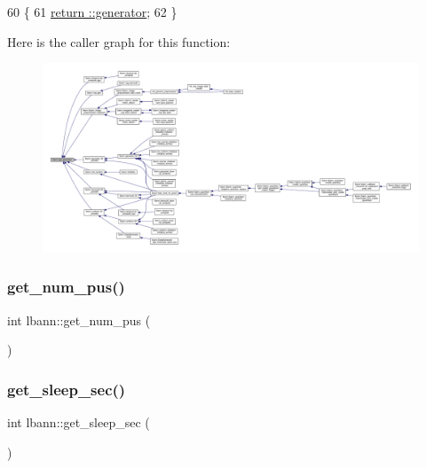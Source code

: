 \begin{DoxyCode}
60                          \{
61   \hyperlink{namespaceanonymous__namespace_02random_8cpp_03_a83826c4b587d1825f13b833be6fe047f}{return ::generator};
62 \}
\end{DoxyCode}
Here is the caller graph for this function\+:\nopagebreak
\begin{figure}[H]
\begin{center}
\leavevmode
\includegraphics[width=350pt]{namespacelbann_a4fea7ba21017b49d1e34394b4c20c764_icgraph}
\end{center}
\end{figure}
\mbox{\label{namespacelbann_abee17f56525b3894b0d3621a307faebd}} 
\subsubsection{\texorpdfstring{get\+\_\+num\+\_\+pus()}{get\_num\_pus()}}
{\footnotesize\ttfamily int lbann\+::get\+\_\+num\+\_\+pus (\begin{DoxyParamCaption}{ }\end{DoxyParamCaption})}

\mbox{\label{namespacelbann_a17d55032bad5bb02903f9b1d933836a4}} 
\subsubsection{\texorpdfstring{get\+\_\+sleep\+\_\+sec()}{get\_sleep\_sec()}}
{\footnotesize\ttfamily int lbann\+::get\+\_\+sleep\+\_\+sec (\begin{DoxyParamCaption}{ }\end{DoxyParamCaption})}

